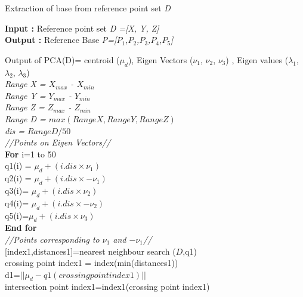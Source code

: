 \documentclass[12pt]{article}
\begin{document}
 
\begin{algorithm}[H]
\caption{Extraction of base from reference point set \textit{D}}
\textbf{Input :} Reference point set \textit{D =[X, Y, Z]} \\
\textbf{Output :} Reference Base
\textit{P=[$P_1$,$P_2$,$P_3$,$P_4$,$P_5$]}\\
\vspace{0.25cm}

Output of PCA(D)= centroid ($\mu_d$), Eigen Vectors ($\nu_1$, $\nu_2$, $\nu_3$) , Eigen values ($\lambda_1$, $\lambda_2$, $\lambda_3$)\\
\vspace{0.25cm}
\textit{Range X = $X_{max}$ - $X_{min}$}\\
\textit{Range Y = $Y_{max}$ - $Y_{min}$}\\
\textit{Range Z = $Z_{max}$ - $Z_{min}$}\\
\textit{Range D = $max(Range X, Range Y, Range Z )$}\\
\textit{dis = $Range D / 50$}\\
\vspace{0.25cm}
\textit{//Points on Eigen Vectors//}\\
\vspace{0.15cm}
\textbf{For} i=1 to 50\\
\hspace{0.75cm}
q1(i) = $\mu_d + (i.dis \times \nu_1)$\\
\hspace{0.75cm}
q2(i) = $\mu_d + (i.dis \times -\nu_1)$\\
\hspace{0.75cm}
q3(i)= $\mu_d + (i.dis \times \nu_2)$\\
\hspace{0.75cm}
q4(i)= $\mu_d + (i.dis \times -\nu_2)$\\
\hspace{0.75cm}
q5(i)=$\mu_d + (i.dis \times \nu_3)$\\
\textbf{End for}\\
\vspace{0.25cm}
\textit{//Points corresponding to $\nu_1$ and $-\nu_1$//}\\
\vspace{0.25cm}
[index1,distances1]=nearest neighbour search ($D$,q1)\\
crossing point index1 = index(min(distances1))\\
d1=$||\mu_d-q1(crossing point index1)||$\\
intersection point index1=index1(crossing point index1)\\

\end{algorithm}
\end{document}
